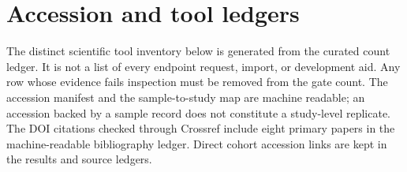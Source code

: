 \documentclass[11pt,a4paper]{article}
\begin{document}
\appendix\section{Accession and tool ledgers}
The distinct scientific tool inventory below is generated from the curated count ledger. It is not a list of every endpoint request, import, or development aid. Any row whose evidence fails inspection must be removed from the gate count. The accession manifest and the sample-to-study map are machine readable; an accession backed by a sample record does not constitute a study-level replicate. The DOI citations checked through Crossref include eight primary papers in the machine-readable bibliography ledger. Direct cohort accession links are kept in the results and source ledgers.

 
\end{document}
